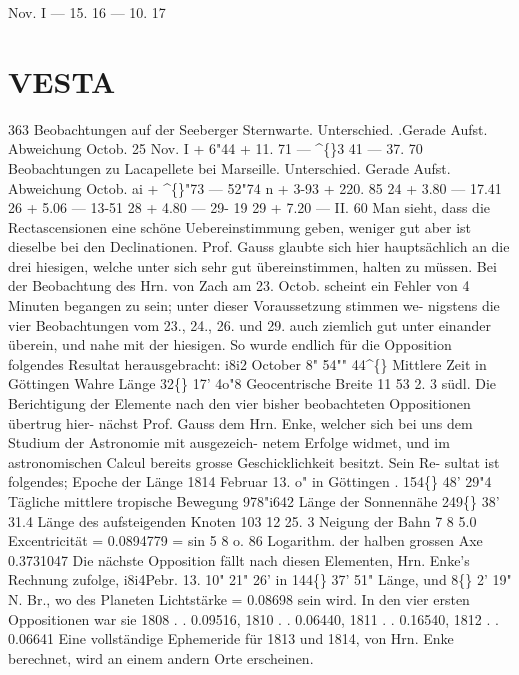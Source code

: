 \documentclass[12pt,a4paper]{article}
\newcommand{\degree}{\textdegree}
\begin{document}
Nov. 
I 
--- 
15. 16 
---  10. 
17 


\newpage

\section*{VESTA}
363 
Beobachtungen  auf  der  Seeberger  Sternwarte. 
Unterschied. 
.Gerade  Aufst.    Abweichung 
Octob.  25 
Nov.      I 
+   6"44 
+  11.  71 
---  \textasciicircum\{\}3  41 
---  37.  70 
Beobachtungen  zu  Lacapellete  bei  Marseille. 
Unterschied. 
Gerade  Aufst. 
Abweichung 
Octob.  ai 
+  \textasciicircum\{\}"73 
---    52"74 
n 
+  3-93 
+  220.  85 
24 
+  3.80 
---    17.41 
26 
+  5.06 
---    13-51 
28 
+  4.80 
---    29-  19 
29 
+  7.20 
---    II.  60 
Man  sieht,  dass  die  Rectascensionen  eine  schöne  Uebereinstimmung  geben,  weniger  gut  aber  ist 
dieselbe  bei  den  Declinationen.  Prof.  Gauss  glaubte  sich  hier  hauptsächlich  an  die  drei  hiesigen,  welche 
unter  sich  sehr  gut  übereinstimmen,  halten  zu  müssen.  Bei  der  Beobachtung  des  Hrn.  von  Zach  am 
23.  Octob.  scheint  ein  Fehler  von  4  Minuten  begangen  zu  sein;  unter  dieser  Voraussetzung  stimmen  we- 
nigstens die  vier  Beobachtungen  vom  23.,  24.,  26.  und  29.  auch  ziemlich  gut  unter  einander  überein,  und 
nahe  mit  der  hiesigen.    So  wurde  endlich  für  die  Opposition  folgendes  Resultat  herausgebracht: 
i8i2  October  8"  54""  44\textasciicircum\{\}  Mittlere  Zeit  in  Göttingen 
Wahre  Länge   
32\degree\{\}  17'    4o"8 
Geocentrische  Breite   
11      53  2. 3  südl. 
Die  Berichtigung  der  Elemente  nach  den  vier  bisher  beobachteten  Oppositionen  übertrug  hier- 
nächst  Prof.  Gauss  dem  Hrn.  Enke,  welcher  sich  bei  uns  dem  Studium  der  Astronomie  mit  ausgezeich- 
netem Erfolge  widmet,  und  im  astronomischen  Calcul  bereits  grosse  Geschicklichkeit  besitzt.  Sein  Re- 
sultat ist  folgendes; 
Epoche  der  Länge  1814  Februar  13.  o"  in  Göttingen     .  154\degree\{\}  48'  29"4 
Tägliche  mittlere  tropische  Bewegung    978"i642 
Länge  der  Sonnennähe    249\degree\{\}  38'  31.4 
Länge  des  aufsteigenden  Knoten    103     12  25. 3 
Neigung  der  Bahn    7      8  5.0 
Excentricität   
=  0.0894779  =  sin  5      8  o.  86 
Logarithm.  der  halben  grossen  Axe    0.3731047 
Die  nächste  Opposition  fällt  nach  diesen  Elementen,  Hrn.  Enke's  Rechnung  zufolge,  i8i4Pebr.  13. 
10"  21"  26'  in  144\degree\{\}  37'  51"  Länge,  und  8\degree\{\}  2'  19"  N.  Br.,  wo  des  Planeten  Lichtstärke  =  0.08698  sein 
wird.     In  den  vier  ersten  Oppositionen  war  sie 
1808  .  .  0.09516,  1810  .  .  0.06440,  1811  .  .  0.16540,  1812  .  .  0.06641 
Eine  vollständige  Ephemeride  für  1813  und  1814,  von  Hrn.  Enke  berechnet,  wird  an  einem  andern  Orte 
erscheinen. 
\end{document}
